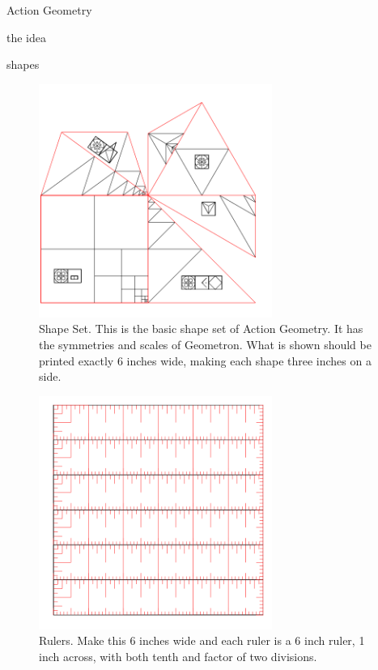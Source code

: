 Action Geometry

the idea

shapes

\begin{figure}
	\centering
	\includegraphics[width=3in]{figures/actiongeometry/shapeset.png}
	\caption[shapeset]
	{Shape Set. This is the basic shape set of Action Geometry.  It has the symmetries and scales of Geometron. What is shown should be printed exactly 6 inches wide, making each shape three inches on a side.}
\end{figure}

\begin{figure}
	\centering
	\includegraphics[width=3in]{figures/actiongeometry/rulers.png}
	\caption[rulers]
	{Rulers.  Make this 6 inches wide and each ruler is a 6 inch ruler, 1 inch across, with both tenth and factor of two divisions.}
\end{figure}

